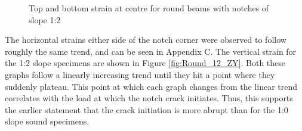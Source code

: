 \documentclass[11pt,a4paper]{article}
\numberwithin{equation}{subsection}
\begin{document}
\vspace*{\baselineskip}

\begin{figure}[h]
	\begin{center}
	\end{center}
	\caption{Top and bottom strain at centre for round beams with notches of slope 1:2}
	\label{fig:Round_12_Centre}
\end{figure}
\pagebreak

\noindent
The horizontal strains either side of the notch corner were observed to follow roughly the same trend, and can be seen in Appendix C. The vertical strain for the 1:2 slope specimens are shown in Figure \ref{fig:Round_12_ZY}. Both these graphs follow a linearly increasing trend until they hit a point where they suddenly plateau. This point at which each graph changes from the linear trend correlates with the load at which the notch crack initiates. Thus, this supports the earlier statement that the crack initiation is more abrupt than for the 1:0 slope sound specimens.  

\vspace*{\baselineskip}
\end{document}
